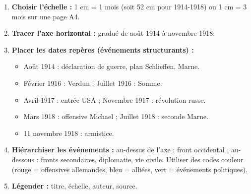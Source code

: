 \documentclass[11pt]{article}
\begin{document}
\begin{methode}
\begin{enumerate}
\item \textbf{Choisir l'échelle :} 1 cm = 1 mois (soit 52 cm pour 1914-1918) ou 1 cm = 3 mois sur une page A4.
\item \textbf{Tracer l'axe horizontal :} gradué de août 1914 à novembre 1918.
\item \textbf{Placer les dates repères (événements structurants) :}
  \begin{itemize}
  \item Août 1914 : déclaration de guerre, plan Schlieffen, Marne.
  \item Février 1916 : Verdun ; Juillet 1916 : Somme.
  \item Avril 1917 : entrée USA ; Novembre 1917 : révolution russe.
  \item Mars 1918 : offensive Michael ; Juillet 1918 : seconde Marne.
  \item 11 novembre 1918 : armistice.
  \end{itemize}
\item \textbf{Hiérarchiser les événements :} au-dessus de l'axe : front occidental ; au-dessous : fronts secondaires, diplomatie, vie civile. Utiliser des codes couleur (rouge = offensives allemandes, bleu = alliées, vert = événements politiques).
\item \textbf{Légender :} titre, échelle, auteur, source.
\end{enumerate}
\end{methode}
\end{document}
